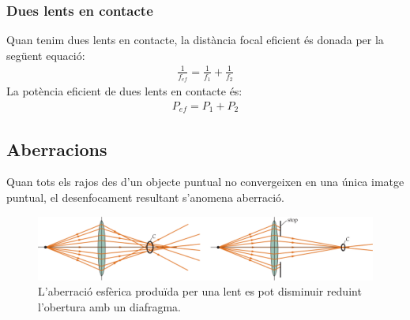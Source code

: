 \subsubsection*{Dues lents en contacte}
Quan tenim dues lents en contacte, la distància focal eficient és donada per la següent equació: 
\begin{align}
    \boxed{\frac{1}{f_{ef}} = \frac{1}{f_{1}} + \frac{1}{f_{2}}}
\end{align}
La potència eficient de dues lents en contacte és:
\begin{align}
    \boxed{P_{ef} = P_{1} + P_{2}}
\end{align}

\subsection{Aberracions}
Quan tots els rajos des d'un objecte puntual no convergeixen en una única imatge puntual, el desenfocament resultant s'anomena aberració. 
\begin{figure}[H]
\centering
    \includegraphics[width=\textwidth]{images/4/45-aberracions.png}
\caption{L'aberració esfèrica produïda per una lent es pot disminuir reduint l'obertura amb un diafragma.}
\end{figure}